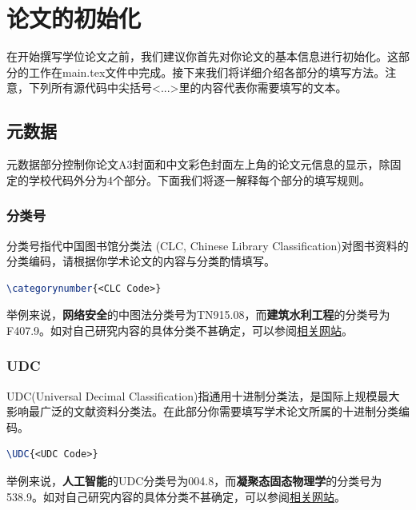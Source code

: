 \chapter{论文的初始化}
\label{chp:initialization}

在开始撰写学位论文之前，我们建议你首先对你论文的基本信息进行初始化。这部分的工作在main.tex文件中完成。接下来我们将详细介绍各部分的填写方法。注意，下列所有源代码中尖括号{\codefont <...>}里的内容代表你需要填写的文本。

\section{元数据}

元数据部分控制你论文A3封面和中文彩色封面左上角的论文元信息的显示，除固定的学校代码外分为4个部分。下面我们将逐一解释每个部分的填写规则。

\subsection{分类号}

分类号指代中国图书馆分类法 (CLC, Chinese Library Classification)对图书资料的分类编码，请根据你学术论文的内容与分类酌情填写。

\begin{tcolorbox}
\begin{lstlisting}[language=TeX]
\categorynumber{<CLC Code>}
\end{lstlisting}
\end{tcolorbox}

\noindent 举例来说，\textbf{网络安全}的中图法分类号为TN915.08，而\textbf{建筑水利工程}的分类号为F407.9。如对自己研究内容的具体分类不甚确定，可以参阅\href{https://www.clcindex.com/}{相关网站}。

\subsection{UDC}

UDC(Universal Decimal Classification)指通用十进制分类法，是国际上规模最大影响最广泛的文献资料分类法。在此部分你需要填写学术论文所属的十进制分类编码。

\begin{tcolorbox}
\begin{lstlisting}[language=TeX]
\UDC{<UDC Code>}
\end{lstlisting}
\end{tcolorbox}

\noindent 举例来说，\textbf{人工智能}的UDC分类号为004.8，而\textbf{凝聚态固态物理学}的分类号为538.9。如对自己研究内容的具体分类不甚确定，可以参阅\href{http://www.udcsummary.info/php/index.php?lang=chi}{相关网站}。

